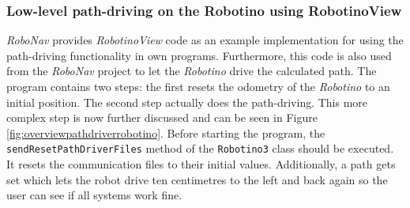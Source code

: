 \newpage
\subsubsection{Low-level path-driving on the Robotino using RobotinoView}
\label{subsubsec:pathdriverRobotino}
\textit{RoboNav} provides \textit{RobotinoView} code as an example implementation for using the path-driving functionality in own programs. Furthermore, this code is also used from the \textit{RoboNav} project to let the \textit{Robotino} drive the calculated path. 
The program contains two steps: the first resets the odometry of the \textit{Robotino} to an initial position. The second step actually does the path-driving. This more complex step is now further discussed and can be seen in Figure \ref{fig:overviewpathdriverrobotino}.
Before starting the program, the \texttt{sendResetPathDriverFiles} method of the \texttt{Robotino3} class should be executed. It resets the communication files to their initial values. Additionally, a path gets set which lets the robot drive ten centimetres to the left and back again so the user can see if all systems work fine. %

